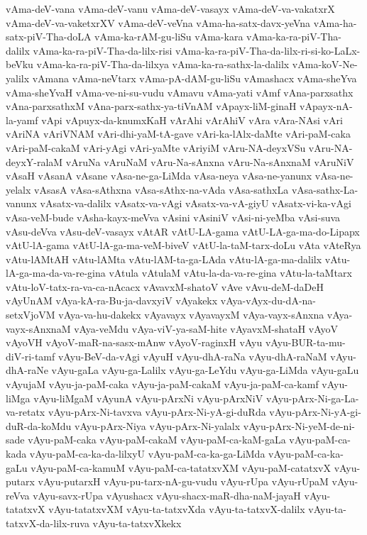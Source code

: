 {vAma-deV-vana
vAma-deV-vanu
vAma-deV-vasayx
vAma-deV-va-vakatxrX
vAma-deV-va-vaketxrXV
vAma-deV-veVna
vAma-ha-satx-davx-yeVna
vAma-ha-satx-piV-Tha-doLA
vAma-ka-rAM-gu-liSu
vAma-kara
vAma-ka-ra-piV-Tha-dalilx
vAma-ka-ra-piV-Tha-da-lilx-risi
vAma-ka-ra-piV-Tha-da-lilx-ri-si-ko-LaLx-beVku
vAma-ka-ra-piV-Tha-da-lilxya
vAma-ka-ra-sathx-la-dalilx
vAma-koV-Ne-yalilx
vAmana
vAma-neVtarx
vAma-pA-dAM-gu-liSu
vAmashacx
vAma-sheYva
vAma-sheYvaH
vAma-ve-ni-su-vudu
vAmavu
vAma-yati
vAmf
vAna-parxsathx
vAna-parxsathxM
vAna-parx-sathx-ya-tiVnAM
vApayx-liM-ginaH
vApayx-nA-la-yamf
vApi
vApuyx-da-knumxKaH
vArAhi
vArAhiV
vAra
vAra-NAsi
vAri
vAriNA
vAriVNAM
vAri-dhi-yaM-tA-gave
vAri-ka-lAlx-daMte
vAri-paM-caka
vAri-paM-cakaM
vAri-yAgi
vAri-yaMte
vAriyiM
vAru-NA-deyxVSu
vAru-NA-deyxY-ralaM
vAruNa
vAruNaM
vAru-Na-sAnxna
vAru-Na-sAnxnaM
vAruNiV
vAsaH
vAsanA
vAsane
vAsa-ne-ga-LiMda
vAsa-neya
vAsa-ne-yanunx
vAsa-ne-yelalx
vAsasA
vAsa-sAthxna
vAsa-sAthx-na-vAda
vAsa-sathxLa
vAsa-sathx-La-vanunx
vAsatx-va-dalilx
vAsatx-va-vAgi
vAsatx-va-vA-giyU
vAsatx-vi-ka-vAgi
vAsa-veM-bude
vAsha-kayx-meVva
vAsini
vAsiniV
vAsi-ni-yeMba
vAsi-suva
vAsu-deVva
vAsu-deV-vasayx
vAtAR
vAtU-LA-gama
vAtU-LA-ga-ma-do-Lipapx
vAtU-lA-gama
vAtU-lA-ga-ma-veM-biveV
vAtU-la-taM-tarx-doLu
vAta
vAteRya
vAtu-lAMtAH
vAtu-lAMta
vAtu-lAM-ta-ga-LAda
vAtu-lA-ga-ma-dalilx
vAtu-lA-ga-ma-da-va-re-gina
vAtula
vAtulaM
vAtu-la-da-va-re-gina
vAtu-la-taMtarx
vAtu-loV-tatx-ra-va-ca-nAcacx
vAvavxM-shatoV
vAve
vAvu-deM-daDeH
vAyUnAM
vAya-kA-ra-Bu-ja-davxyiV
vAyakekx
vAya-vAyx-du-dA-na-setxVjoVM
vAya-va-hu-dakekx
vAyavayx
vAyavayxM
vAya-vayx-sAnxna
vAya-vayx-sAnxnaM
vAya-veMdu
vAya-viV-ya-saM-hite
vAyavxM-shataH
vAyoV
vAyoVH
vAyoV-maR-na-sasx-mAnw
vAyoV-raginxH
vAyu
vAyu-BUR-ta-mu-diV-ri-tamf
vAyu-BeV-da-vAgi
vAyuH
vAyu-dhA-raNa
vAyu-dhA-raNaM
vAyu-dhA-raNe
vAyu-gaLa
vAyu-ga-Lalilx
vAyu-ga-LeYdu
vAyu-ga-LiMda
vAyu-gaLu
vAyujaM
vAyu-ja-paM-caka
vAyu-ja-paM-cakaM
vAyu-ja-paM-ca-kamf
vAyu-liMga
vAyu-liMgaM
vAyunA
vAyu-pArxNi
vAyu-pArxNiV
vAyu-pArx-Ni-ga-La-va-retatx
vAyu-pArx-Ni-tavxva
vAyu-pArx-Ni-yA-gi-duRda
vAyu-pArx-Ni-yA-gi-duR-da-koMdu
vAyu-pArx-Niya
vAyu-pArx-Ni-yalalx
vAyu-pArx-Ni-yeM-de-ni-sade
vAyu-paM-caka
vAyu-paM-cakaM
vAyu-paM-ca-kaM-gaLa
vAyu-paM-ca-kada
vAyu-paM-ca-ka-da-lilxyU
vAyu-paM-ca-ka-ga-LiMda
vAyu-paM-ca-ka-gaLu
vAyu-paM-ca-kamuM
vAyu-paM-ca-tatatxvXM
vAyu-paM-catatxvX
vAyu-putarx
vAyu-putarxH
vAyu-pu-tarx-nA-gu-vudu
vAyu-rUpa
vAyu-rUpaM
vAyu-reVva
vAyu-savx-rUpa
vAyushacx
vAyu-shacx-maR-dha-naM-jayaH
vAyu-tatatxvX
vAyu-tatatxvXM
vAyu-ta-tatxvXda
vAyu-ta-tatxvX-dalilx
vAyu-ta-tatxvX-da-lilx-ruva
vAyu-ta-tatxvXkekx
}
